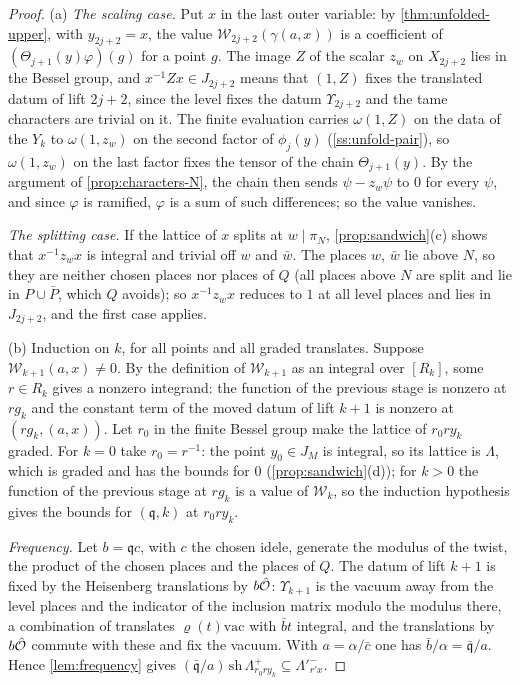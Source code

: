 \begin{proof}
(a) \emph{The scaling case.} Put $x$ in the last outer variable: by \cref{thm:unfolded-upper}, with $y_{2j+2}=x$, the value $\mathcal W_{2j+2}(\gamma(a,x))$ is a coefficient of $(\Theta_{j+1}(y)\varphi)(g)$ for a point $g$. The image $Z$ of the scalar $z_w$ on $X_{2j+2}$ lies in the Bessel group, and
$x^{-1}Zx\in J_{2j+2}$ means that $(1,Z)$ fixes the translated datum of lift $2j+2$, since the level fixes the datum $\Upsilon_{2j+2}$ and the tame characters are trivial on it. The finite evaluation carries $\omega(1,Z)$ on the data of the $Y_k$ to $\omega(1,z_w)$ on the second factor of $\phi_j(y)$
(\cref{ss:unfold-pair}), so $\omega(1,z_w)$ on the last factor fixes the tensor of the chain $\Theta_{j+1}(y)$. By the argument of \cref{prop:characters-N}, the chain then sends $\psi-z_w\psi$ to $0$ for every $\psi$, and since $\varphi$ is ramified, $\varphi$ is a sum of such differences; so the value vanishes.

\emph{The splitting case.} If the lattice of $x$ splits at $w\mid\pi_N$, \cref{prop:sandwich}(c) shows that $x^{-1}z_wx$ is integral and trivial off $w$ and $\bar w$. The places $w$, $\bar w$ lie above $N$, so they are neither chosen places nor places of $Q$ (all places above $N$ are split and lie in $P\cup\bar P$, which $Q$ avoids); so
$x^{-1}z_wx$ reduces to $1$ at all level places and lies in $J_{2j+2}$, and the first case applies.

(b) Induction on $k$, for all points and all graded translates. Suppose $\mathcal W_{k+1}(a,x)\ne0$. By the definition of $\mathcal W_{k+1}$ as an integral over $[R_k]$, some $r\in R_k$ gives a nonzero integrand: the function of the previous stage is nonzero at $rg_k$ and the constant term of the moved datum of lift $k+1$ is nonzero at
$(rg_k,(a,x))$. Let $r_0$ in the finite Bessel group make the lattice of $r_0ry_k$ graded. For $k=0$ take $r_0=r^{-1}$: the point $y_0\in J_M$ is integral, so its lattice is $\Lambda$, which is graded and has the bounds for $0$ (\cref{prop:sandwich}(d)); for $k>0$ the function of the previous stage at $rg_k$ is a value of $\mathcal W_k$,
so the induction hypothesis gives the bounds for $(\mathfrak q,k)$ at $r_0ry_k$.

\emph{Frequency.} Let $b=\mathfrak q c$, with $c$ the chosen idele, generate the modulus of the twist, the product of the chosen places and the places of $Q$. The datum of lift $k+1$ is fixed by the Heisenberg translations by $b\hat{\mathcal{O}}$: $\Upsilon_{k+1}$ is the vacuum away from the level places and the indicator of the inclusion matrix modulo the
modulus there, a combination of translates $\varrho(t)\mathrm{vac}$ with $\bar bt$ integral, and the translations by $b\hat{\mathcal{O}}$ commute with these and fix the vacuum. With $a=\alpha/\bar c$ one has $\bar b/\alpha=\bar{\mathfrak q}/a$. Hence \cref{lem:frequency} gives $(\bar{\mathfrak q}/a)\,\mathrm{sh}\,\Lambda^+_{r_0ry_k}\subseteq\Lambda'^-_{r'x}$.


\end{proof}

